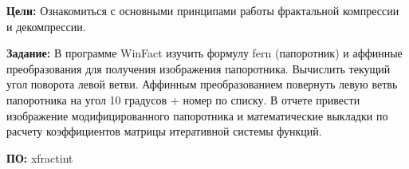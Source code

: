 
\textbf{Цели:} Ознакомиться с основными принципами работы фрактальной компрессии и декомпрессии.

\textbf{Задание:}
В программе WinFact изучить формулу fern (папоротник) и аффинные преобразования для получения изображения папоротника. Вычислить текущий угол поворота левой ветви. Аффинным преобразованием повернуть левую ветвь папоротника на угол 10 градусов + номер по списку. В отчете привести изображение модифицированного папоротника и математические выкладки по расчету коэффициентов матрицы итеративной системы функций.

\textbf{ПО:} xfractint

\pagebreak